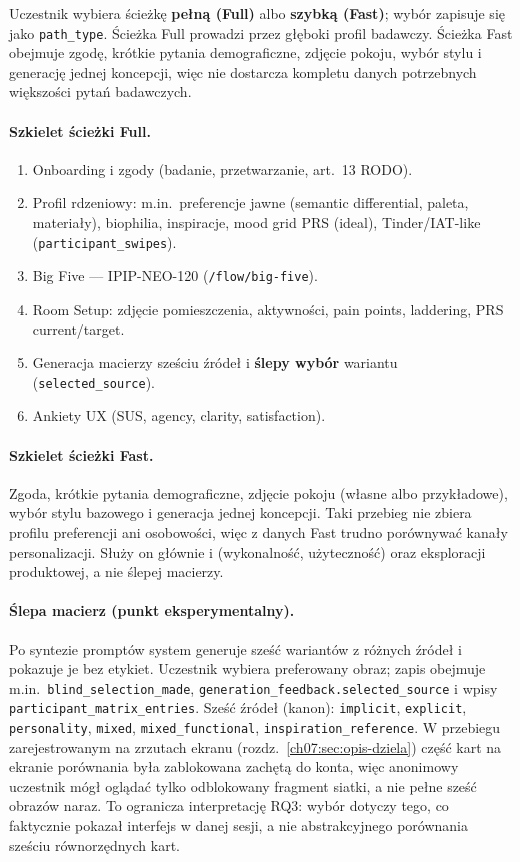 Uczestnik wybiera ścieżkę \textbf{pełną (Full)} albo \textbf{szybką (Fast)}; wybór zapisuje się jako \texttt{path\_type}. Ścieżka Full prowadzi przez głęboki profil badawczy. Ścieżka Fast obejmuje zgodę, krótkie pytania demograficzne, zdjęcie pokoju, wybór stylu i generację jednej koncepcji, więc nie dostarcza kompletu danych potrzebnych większości pytań badawczych.

\paragraph{Szkielet ścieżki Full.}
\begin{enumerate}
  \item Onboarding i zgody (badanie, przetwarzanie, art.~13 RODO).
  \item Profil rdzeniowy: m.in.\ preferencje jawne (semantic differential, paleta, materiały), biophilia, inspiracje, mood grid PRS (ideal), Tinder/IAT-like (\texttt{participant\_swipes}).
  \item Big Five --- IPIP-NEO-120 (\texttt{/flow/big-five}).
  \item Room Setup: zdjęcie pomieszczenia, aktywności, pain points, laddering, PRS current/target.
  \item Generacja macierzy sześciu źródeł i \textbf{ślepy wybór} wariantu (\texttt{selected\_source}).
  \item Ankiety UX (SUS, agency, clarity, satisfaction).
\end{enumerate}

\paragraph{Szkielet ścieżki Fast.}
Zgoda, krótkie pytania demograficzne, zdjęcie pokoju (własne albo przykładowe), wybór stylu bazowego i generacja jednej koncepcji. Taki przebieg nie zbiera profilu preferencji ani osobowości, więc z danych Fast trudno porównywać kanały personalizacji. Służy on głównie  i  (wykonalność, użyteczność) oraz eksploracji produktowej, a nie ślepej macierzy.

\paragraph{Ślepa macierz (punkt eksperymentalny).}
Po syntezie promptów system generuje sześć wariantów z różnych źródeł i pokazuje je bez etykiet. Uczestnik wybiera preferowany obraz; zapis obejmuje m.in.\ \texttt{blind\_selection\_made}, \texttt{generation\_feedback.selected\_source} i wpisy \texttt{participant\_matrix\_entries}. Sześć źródeł (kanon): \texttt{implicit}, \texttt{explicit}, \texttt{personality}, \texttt{mixed}, \texttt{mixed\_functional}, \texttt{inspiration\_reference}.
W przebiegu zarejestrowanym na zrzutach ekranu (rozdz.~\ref{ch07:sec:opis-dziela}) część kart na ekranie porównania była zablokowana zachętą do konta, więc anonimowy uczestnik mógł oglądać tylko odblokowany fragment siatki, a nie pełne sześć obrazów naraz. To ogranicza interpretację RQ3: wybór dotyczy tego, co faktycznie pokazał interfejs w danej sesji, a nie abstrakcyjnego porównania sześciu równorzędnych kart.

